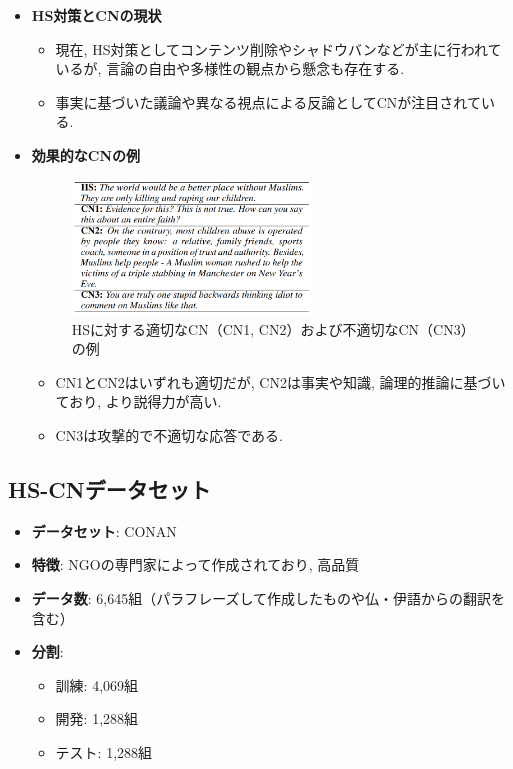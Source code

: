 \documentclass[dvipdfmx]{jsarticle}
\begin{document}
\begin{itemize}
  \item \textbf{HS対策とCNの現状}
        \begin{itemize}
          \item 現在, HS対策としてコンテンツ削除やシャドウバンなどが主に行われているが, 言論の自由や多様性の観点から懸念も存在する.
          \item 事実に基づいた議論や異なる視点による反論としてCNが注目されている.
        \end{itemize}

  \item \textbf{効果的なCNの例}
        \begin{figure}[H]
          \centering
          \includegraphics[width=0.6\textwidth]{01.png}
          \caption{HSに対する適切なCN（CN1, CN2）および不適切なCN（CN3）の例 \cite{chung2021}}
          \label{fig:cn_example}
        \end{figure}
        \begin{itemize}
          \item CN1とCN2はいずれも適切だが, CN2は事実や知識, 論理的推論に基づいており, より説得力が高い.
          \item CN3は攻撃的で不適切な応答である.
        \end{itemize}
\end{itemize}

\vspace{0.5em}

\subsection{HS-CNデータセット}

\begin{itemize}
  \item \textbf{データセット}: CONAN
  \item \textbf{特徴}: NGOの専門家によって作成されており, 高品質
  \item \textbf{データ数}: 6,645組（パラフレーズして作成したものや仏・伊語からの翻訳を含む）
  \item \textbf{分割}:
        \begin{itemize}
          \item 訓練: 4,069組
          \item 開発: 1,288組
          \item テスト: 1,288組
        \end{itemize}
\end{itemize}
\end{document}
